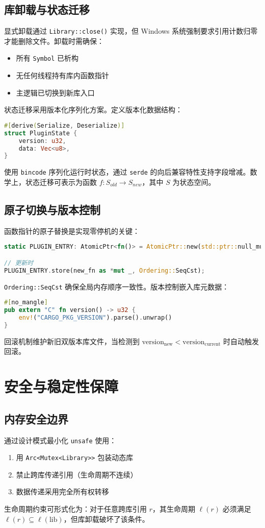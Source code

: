\section{库卸载与状态迁移}
显式卸载通过 \texttt{Library::close()} 实现，但 Windows 系统强制要求引用计数归零才能删除文件。卸载时需确保：\par
\begin{itemize}
\item 所有 \texttt{Symbol} 已析构
\item 无任何线程持有库内函数指针
\item 主逻辑已切换到新库入口
\end{itemize}
状态迁移采用版本化序列化方案。定义版本化数据结构：\par
\begin{lstlisting}[language=rust]
#[derive(Serialize, Deserialize)]
struct PluginState {
    version: u32,
    data: Vec<u8>,
}
\end{lstlisting}
使用 \texttt{bincode} 序列化运行时状态，通过 \texttt{serde} 的向后兼容特性支持字段增减。数学上，状态迁移可表示为函数 $f: S_{old} \rightarrow S_{new}$，其中 $S$ 为状态空间。\par
\section{原子切换与版本控制}
函数指针的原子替换是实现零停机的关键：\par
\begin{lstlisting}[language=rust]
static PLUGIN_ENTRY: AtomicPtr<fn()> = AtomicPtr::new(std::ptr::null_mut());

// 更新时
PLUGIN_ENTRY.store(new_fn as *mut _, Ordering::SeqCst);
\end{lstlisting}
\texttt{Ordering::SeqCst} 确保全局内存顺序一致性。版本控制嵌入库元数据：\par
\begin{lstlisting}[language=rust]
#[no_mangle]
pub extern "C" fn version() -> u32 {
    env!("CARGO_PKG_VERSION").parse().unwrap()
}
\end{lstlisting}
回滚机制维护新旧双版本库文件，当检测到 $\text{version}_{\text{new}} < \text{version}_{\text{current}}$ 时自动触发回滚。\par
\chapter{安全与稳定性保障}
\section{内存安全边界}
通过设计模式最小化 \texttt{unsafe} 使用：\par
\begin{enumerate}
\item 用 \texttt{Arc<Mutex<Library>>} 包装动态库
\item 禁止跨库传递引用（生命周期不连续）
\item 数据传递采用完全所有权转移
\end{enumerate}
生命周期约束可形式化为：对于任意跨库引用 $r$，其生命周期 $\ell(r)$ 必须满足 $\ell(r) \subseteq \ell(\text{lib})$，但库卸载破坏了该条件。\par
